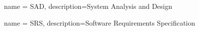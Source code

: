 

{
    name = SAD,
    description={System Analysis and Design}
}

{
    name = SRS,
    description={Software Requirements Specification}
}